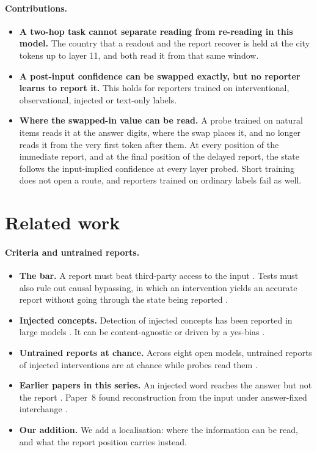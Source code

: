 \documentclass[11pt]{article}
\begin{document}
\paragraph{Contributions.}
\begin{itemize}
\item \textbf{A two-hop task cannot separate reading from re-reading in this model.} The country that a readout and the report recover is held at the city tokens up to layer 11, and both read it from that same window.
\item \textbf{A post-input confidence can be swapped exactly, but no reporter learns to report it.} This holds for reporters trained on interventional, observational, injected or text-only labels.
\item \textbf{Where the swapped-in value can be read.} A probe trained on natural items reads it at the answer digits, where the swap places it, and no longer reads it from the very first token after them. At every position of the immediate report, and at the final position of the delayed report, the state follows the input-implied confidence at every layer probed. Short training does not open a route, and reporters trained on ordinary labels fail as well.
\end{itemize}

\section{Related work}
\label{sec:related}

\paragraph{Criteria and untrained reports.}
\begin{itemize}
\item \textbf{The bar.} A report must beat third-party access to the input \citep{song2025privileged,singh2026reality}. Tests must also rule out causal bypassing, in which an intervention yields an accurate report without going through the state being reported \citep{morris2025bypassing}.
\item \textbf{Injected concepts.} Detection of injected concepts has been reported in large models \citep{lindsey2025emergent,macar2026mechanisms}. It can be content-agnostic \citep{lederman2026contentagnostic} or driven by a yes-bias \citep{hahami2025detecting}.
\item \textbf{Untrained reports at chance.} Across eight open models, untrained reports of injected interventions are at chance while probes read them \citep{ferrara2026owmi}.
\item \textbf{Earlier papers in this series.} An injected word reaches the answer but not the report \citep{ramdan2026injected}. Paper~8 found reconstruction from the input under answer-fixed interchange \citep{ramdan2026settling}.
\item \textbf{Our addition.} We add a localisation: where the information can be read, and what the report position carries instead.
\end{itemize}
\end{document}
